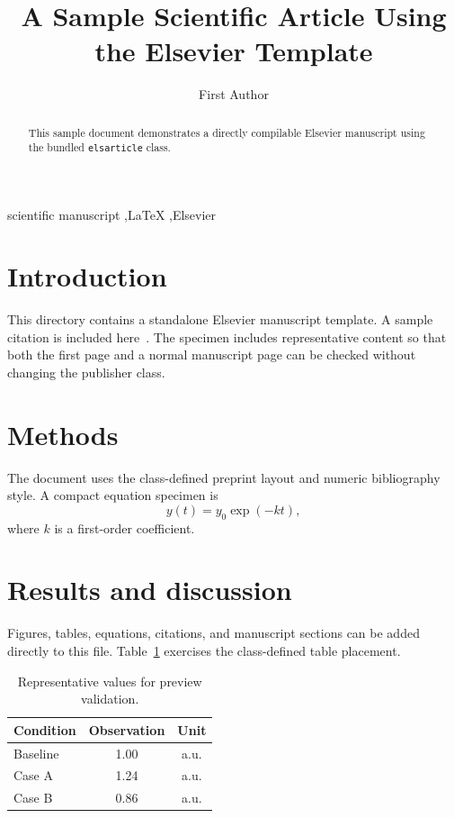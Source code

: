 \documentclass[preprint,12pt]{elsarticle}
\begin{document}
\begin{frontmatter}

\title{A Sample Scientific Article Using the Elsevier Template}
\author[inst1]{First Author}
\address[inst1]{Department, Research Institution, City, Country}

\begin{abstract}
This sample document demonstrates a directly compilable Elsevier manuscript using the bundled \texttt{elsarticle} class.
\end{abstract}

\begin{keyword}
scientific manuscript \sep LaTeX \sep Elsevier
\end{keyword}

\end{frontmatter}

\section{Introduction}
This directory contains a standalone Elsevier manuscript template. A sample citation is included here~\cite{sample2026}. The specimen includes representative content so that both the first page and a normal manuscript page can be checked without changing the publisher class.

\section{Methods}
The document uses the class-defined preprint layout and numeric bibliography style. A compact equation specimen is
\begin{equation}
  y(t)=y_0\exp(-kt),
\end{equation}
where $k$ is a first-order coefficient.

\section{Results and discussion}
Figures, tables, equations, citations, and manuscript sections can be added directly to this file. Table~\ref{tab:sample} exercises the class-defined table placement.

\begin{table}[htbp]
\centering
\caption{Representative values for preview validation.}\label{tab:sample}
\begin{tabular}{lcc}
\toprule
Condition & Observation & Unit \\
\midrule
Baseline & 1.00 & a.u. \\
Case A & 1.24 & a.u. \\
Case B & 0.86 & a.u. \\
\bottomrule
\end{tabular}
\end{table}
\end{document}
